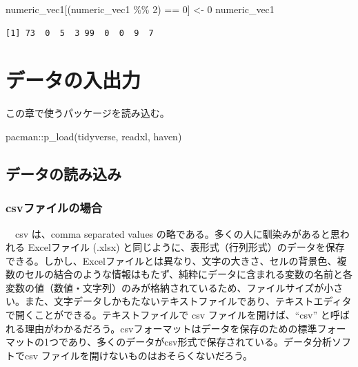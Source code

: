 \documentclass[
  a4paper,
  pandoc,
  ja=standard,
  jafont=haranoaji]{bxjsbook}
\newenvironment{Shaded}{\begin{snugshade}}{\end{snugshade}}
\newcommand{\DecValTok}[1]{\textcolor[rgb]{0.68,0.00,0.00}{#1}}
\newcommand{\FunctionTok}[1]{\textcolor[rgb]{0.28,0.35,0.67}{#1}}
\newcommand{\NormalTok}[1]{\textcolor[rgb]{0.00,0.48,0.65}{#1}}
\newcommand{\OtherTok}[1]{\textcolor[rgb]{0.00,0.48,0.65}{#1}}
\newcommand{\SpecialCharTok}[1]{\textcolor[rgb]{0.37,0.37,0.37}{#1}}
\begin{document}
\begin{Shaded}
\begin{Highlighting}[numbers=left,,]
\NormalTok{numeric\_vec1[(numeric\_vec1 }\SpecialCharTok{\%\%} \DecValTok{2}\NormalTok{) }\SpecialCharTok{==} \DecValTok{0}\NormalTok{] }\OtherTok{\textless{}{-}} \DecValTok{0}
\NormalTok{numeric\_vec1}
\end{Highlighting}
\end{Shaded}

\begin{verbatim}
[1] 73  0  5  3 99  0  0  9  7
\end{verbatim}

\hypertarget{sec-io}{%
\chapter{データの入出力}\label{sec-io}}

この章で使うパッケージを読み込む。

\begin{Shaded}
\begin{Highlighting}[numbers=left,,]
\NormalTok{pacman}\SpecialCharTok{::}\FunctionTok{p\_load}\NormalTok{(tidyverse, readxl, haven)}
\end{Highlighting}
\end{Shaded}

\hypertarget{sec-io_read}{%
\section{データの読み込み}\label{sec-io_read}}

\hypertarget{csvux30d5ux30a1ux30a4ux30ebux306eux5834ux5408}{%
\subsection{csvファイルの場合}\label{csvux30d5ux30a1ux30a4ux30ebux306eux5834ux5408}}

　csv は、comma separated values
の略である。多くの人に馴染みがあると思われる Excelファイル (.xlsx)
と同じように、表形式（行列形式）のデータを保存できる。しかし、Excelファイルとは異なり、文字の大きさ、セルの背景色、複数のセルの結合のような情報はもたず、純粋にデータに含まれる変数の名前と各変数の値（数値・文字列）のみが格納されているため、ファイルサイズが小さい。また、文字データしかもたないテキストファイルであり、テキストエディタで開くことができる。テキストファイルで
csv ファイルを開けば、``csv''
と呼ばれる理由がわかるだろう。csvフォーマットはデータを保存のための標準フォーマットの1つであり、多くのデータがcsv形式で保存されている。データ分析ソフトでcsv
ファイルを開けないものはおそらくないだろう。
\end{document}
